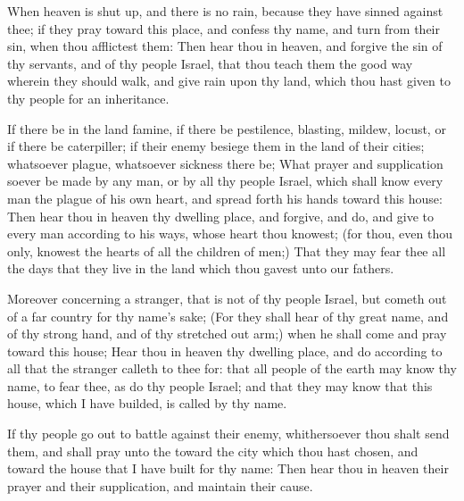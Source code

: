 \verse When heaven is shut up, and there is no rain, because they have sinned against thee; if they pray toward this place, and confess thy name, and turn from their sin, when thou afflictest them: \verse Then hear thou in heaven, and forgive the sin of thy servants, and of thy people Israel, that thou teach them the good way wherein they should walk, and give rain upon thy land, which thou hast given to thy people for an inheritance.

\verse If there be in the land famine, if there be pestilence, blasting, mildew, locust, or if there be caterpiller; if their enemy besiege them in the land of their cities; whatsoever plague, whatsoever sickness there be; \verse What prayer and supplication soever be made by any man, or by all thy people Israel, which shall know every man the plague of his own heart, and spread forth his hands toward this house: \verse Then hear thou in heaven thy dwelling place, and forgive, and do, and give to every man according to his ways, whose heart thou knowest; (for thou, even thou only, knowest the hearts of all the children of men;) \verse That they may fear thee all the days that they live in the land which thou gavest unto our fathers.

\verse Moreover concerning a stranger, that is not of thy people Israel, but cometh out of a far country for thy name's sake; \verse (For they shall hear of thy great name, and of thy strong hand, and of thy stretched out arm;) when he shall come and pray toward this house; \verse Hear thou in heaven thy dwelling place, and do according to all that the stranger calleth to thee for: that all people of the earth may know thy name, to fear thee, as do thy people Israel; and that they may know that this house, which I have builded, is called by thy name.

\verse If thy people go out to battle against their enemy, whithersoever thou shalt send them, and shall pray unto the \LORD toward the city which thou hast chosen, and toward the house that I have built for thy name: \verse Then hear thou in heaven their prayer and their supplication, and maintain their cause.

